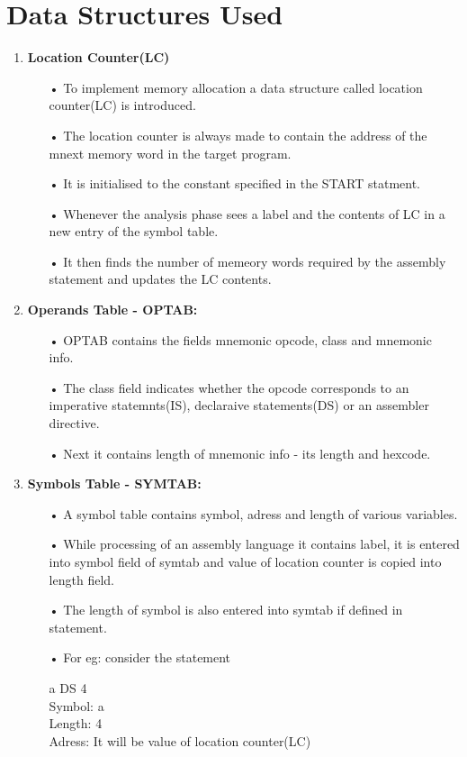 \documentclass{scrreprt}
\begin{document}
\section{Data Structures Used}
\begin{enumerate}

\item \textbf{Location Counter(LC)}
\begin{itemize}
\item[•]To implement memory allocation a data structure called location counter(LC) is introduced.
\item[•]The location counter is always made to contain the address of the mnext memory word in the target program.
\item[•]It is initialised to the constant specified in the START statment.
\item[•]Whenever the analysis phase sees a label and the contents of LC in a new entry of the symbol table.
\item[•]It then finds the number of memeory words required by the assembly statement and updates the LC contents.
\end{itemize}

\item \textbf{Operands Table - OPTAB:}
\begin{itemize}
\item[•]OPTAB contains the fields mnemonic opcode, class and mnemonic info.
\item[•]The class field indicates whether the opcode corresponds  to an imperative statemnts(IS), declaraive statements(DS) or an assembler directive.
\item[•]Next it contains length of mnemonic info - its length and hexcode.
\end{itemize}

\item \textbf{Symbols Table - SYMTAB:}
\begin{itemize}
\item[•]A symbol table contains symbol, adress and length of various variables.
\item[•]While processing of an assembly language it contains label, it is entered into symbol field of symtab and value of location counter is copied into length field.
\item[•]The length of symbol is also entered into symtab if defined in statement.
\item[•]For eg: consider the statement
\begin{center}
a DS 4\\
Symbol: a\\
Length: 4\\
Adress: It will be value of location counter(LC)\\
\end{center}
\end{itemize}


\end{enumerate}
\end{document}

